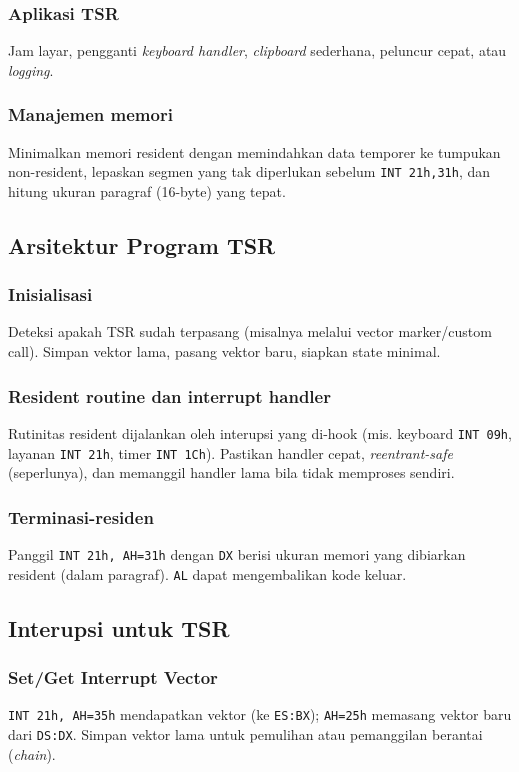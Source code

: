 \subsubsection{Aplikasi TSR}
Jam layar, pengganti \textit{keyboard handler}, \textit{clipboard} sederhana, peluncur cepat, atau \textit{logging}.

\subsubsection{Manajemen memori}
Minimalkan memori resident dengan memindahkan data temporer ke tumpukan non-resident, lepaskan segmen yang tak diperlukan sebelum \texttt{INT 21h,31h}, dan hitung ukuran paragraf (16-byte) yang tepat.

\subsection{Arsitektur Program TSR}
\subsubsection{Inisialisasi}
Deteksi apakah TSR sudah terpasang (misalnya melalui vector marker/custom call). Simpan vektor lama, pasang vektor baru, siapkan state minimal.

\subsubsection{Resident routine dan interrupt handler}
Rutinitas resident dijalankan oleh interupsi yang di-hook (mis. keyboard \texttt{INT 09h}, layanan \texttt{INT 21h}, timer \texttt{INT 1Ch}). Pastikan handler cepat, \textit{reentrant-safe} (seperlunya), dan memanggil handler lama bila tidak memproses sendiri.

\subsubsection{Terminasi-residen}
Panggil \texttt{INT 21h, AH=31h} dengan \texttt{DX} berisi ukuran memori yang dibiarkan resident (dalam paragraf). \texttt{AL} dapat mengembalikan kode keluar.

\subsection{Interupsi untuk TSR}
\subsubsection{Set/Get Interrupt Vector}
\texttt{INT 21h, AH=35h} mendapatkan vektor (ke \texttt{ES:BX}); \texttt{AH=25h} memasang vektor baru dari \texttt{DS:DX}. Simpan vektor lama untuk pemulihan atau pemanggilan berantai (\textit{chain}).

